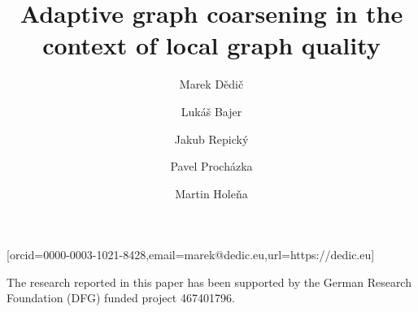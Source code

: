 





\title{Adaptive graph coarsening in the context of local graph quality}
\author[1,2]{Marek Dědič}[orcid=0000-0003-1021-8428,email=marek@dedic.eu,url=https://dedic.eu]
\cormark[1]
\author[2]{Lukáš Bajer}
\author[2]{Jakub Repický}
\author[2]{Pavel Procházka}
\author[3]{Martin Holeňa}

\address[1]{Czech Technical University in Prague, Břehová 7, Prague, Czech Republic}
\address[2]{Cisco Systems, Inc., Karlovo náměstı́ 10, Prague, Czech Republic}
\address[3]{Institute of Computer Science, Czech Academy of Sciences, Pod vodárenskou věží 2, Prague, Czech Republic}




\maketitle








\begin{acknowledgments}
  The research reported in this paper has been supported by the German Research Foundation (DFG) funded project 467401796.
\end{acknowledgments}




